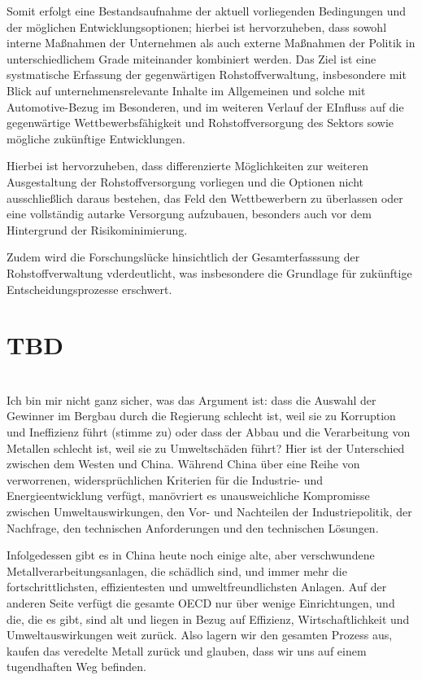 \documentclass[12pt,a4paper,oneside]{book} %
\begin{document}
Somit erfolgt eine Bestandsaufnahme der aktuell vorliegenden Bedingungen und der möglichen Entwicklungsoptionen; hierbei ist hervorzuheben, dass sowohl interne Maßnahmen der Unternehmen als auch externe Maßnahmen der Politik in unterschiedlichem Grade miteinander kombiniert werden. Das Ziel ist eine systmatische Erfassung der gegenwärtigen Rohstoffverwaltung, insbesondere mit Blick auf unternehmensrelevante Inhalte im Allgemeinen und solche mit Automotive-Bezug im Besonderen, und im weiteren Verlauf der EInfluss auf die gegenwärtige Wettbewerbsfähigkeit und Rohstoffversorgung des Sektors sowie mögliche zukünftige Entwicklungen.

Hierbei ist hervorzuheben, dass differenzierte Möglichkeiten zur weiteren Ausgestaltung der Rohstoffversorgung vorliegen und die Optionen nicht ausschließlich daraus bestehen, das Feld den Wettbewerbern zu überlassen oder eine vollständig autarke Versorgung aufzubauen, besonders auch vor dem Hintergrund der Risikominimierung.

Zudem wird die Forschungslücke hinsichtlich der Gesamterfasssung der Rohstoffverwaltung vderdeutlicht, was insbesondere die Grundlage für zukünftige Entscheidungsprozesse erschwert. 

\section{TBD}
\\
Ich bin mir nicht ganz sicher, was das Argument ist: dass die Auswahl der Gewinner im Bergbau durch die Regierung schlecht ist, weil sie zu Korruption und Ineffizienz führt (stimme zu) oder dass der Abbau und die Verarbeitung von Metallen schlecht ist, weil sie zu Umweltschäden führt? Hier ist der Unterschied zwischen dem Westen und China. Während China über eine Reihe von verworrenen, widersprüchlichen Kriterien für die Industrie- und Energieentwicklung verfügt, manövriert es unausweichliche Kompromisse zwischen Umweltauswirkungen, den Vor- und Nachteilen der Industriepolitik, der Nachfrage, den technischen Anforderungen und den technischen Lösungen.

Infolgedessen gibt es in China heute noch einige alte, aber verschwundene Metallverarbeitungsanlagen, die schädlich sind, und immer mehr die fortschrittlichsten, effizientesten und umweltfreundlichsten Anlagen. Auf der anderen Seite verfügt die gesamte OECD nur über wenige Einrichtungen, und die, die es gibt, sind alt und liegen in Bezug auf Effizienz, Wirtschaftlichkeit und Umweltauswirkungen weit zurück. Also lagern wir den gesamten Prozess aus, kaufen das veredelte Metall zurück und glauben, dass wir uns auf einem tugendhaften Weg befinden.
\end{document}
